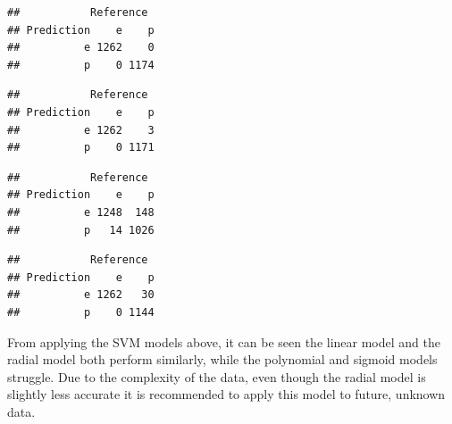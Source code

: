\documentclass[
  english,
  man]{apa6}
\newenvironment{Shaded}{\begin{snugshade}}{\end{snugshade}}
\newcommand{\KeywordTok}[1]{\textcolor[rgb]{0.13,0.29,0.53}{\textbf{#1}}}
\newcommand{\NormalTok}[1]{#1}
\newcommand{\OperatorTok}[1]{\textcolor[rgb]{0.81,0.36,0.00}{\textbf{#1}}}
\begin{document}
\begin{Shaded}
\end{Shaded}

\begin{verbatim}
##           Reference
## Prediction    e    p
##          e 1262    0
##          p    0 1174
\end{verbatim}

\begin{Shaded}
\end{Shaded}

\begin{verbatim}
##           Reference
## Prediction    e    p
##          e 1262    3
##          p    0 1171
\end{verbatim}

\begin{Shaded}
\end{Shaded}

\begin{verbatim}
##           Reference
## Prediction    e    p
##          e 1248  148
##          p   14 1026
\end{verbatim}

\begin{Shaded}
\end{Shaded}

\begin{verbatim}
##           Reference
## Prediction    e    p
##          e 1262   30
##          p    0 1144
\end{verbatim}

From applying the SVM models above, it can be seen the linear model and the radial model both perform similarly, while the polynomial and sigmoid models struggle. Due to the complexity of the data, even though the radial model is slightly less accurate it is recommended to apply this model to future, unknown data.
\end{document}
